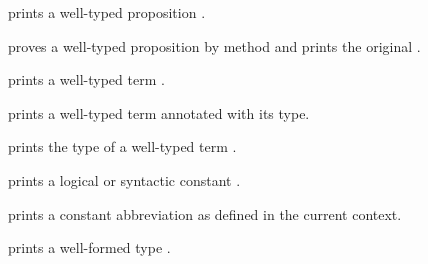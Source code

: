 \begin{isabellebody}
\begin{isamarkuptext}
\begin{description}
  \item {} prints a well-typed proposition \isa{{\isachardoublequote}{\isasymphi}{\isachardoublequote}}.

  \item {} proves a well-typed proposition
  \isa{{\isachardoublequote}{\isasymphi}{\isachardoublequote}} by method  and prints the original \isa{{\isachardoublequote}{\isasymphi}{\isachardoublequote}}.

  \item {} prints a well-typed term .

  \item {} prints a well-typed term 
  annotated with its type.

  \item {} prints the type of a well-typed term
  .

  \item {} prints a logical or syntactic constant
  .
  
  \item {} prints a constant abbreviation
   as defined in the current context.

  \item {} prints a well-formed type \isa{{\isachardoublequote}{\isasymtau}{\isachardoublequote}}.


\end{description}
\end{isamarkuptext}
\end{isabellebody}
